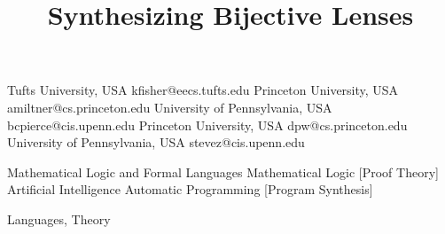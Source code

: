 \documentclass{sigplanconf}
\begin{document}
\setlength{\pdfpageheight}{\paperheight}
\setlength{\pdfpagewidth}{\paperwidth}
\toappear{}






\title{Synthesizing Bijective Lenses}

           {Tufts University, USA}
           {kfisher@eecs.tufts.edu}
           {Princeton University, USA}
           {amiltner@cs.princeton.edu}
           {University of Pennsylvania, USA}
           {bcpierce@cis.upenn.edu}
           {Princeton University, USA}
           {dpw@cs.princeton.edu}
           {University of Pennsylvania, USA}
           {stevez@cis.upenn.edu}
\maketitle


\begin{abstract}

\end{abstract}

\ifanon\else
{}
  {Mathematical Logic and Formal Languages}
  {Mathematical Logic}
  [Proof Theory]
  {Artificial Intelligence}
  {Automatic Pro\-gramming}
  [Program Synthesis]

\terms Languages, Theory
\end{document}
